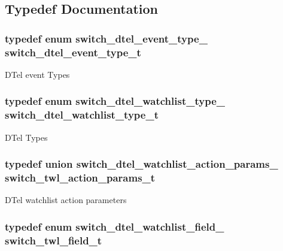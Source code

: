 \subsection{Typedef Documentation}
\hypertarget{group__DTel_ga093c7c7db287f39a58d5b3ec66bf15ec}{
\subsubsection[{switch\+\_\+dtel\+\_\+event\+\_\+type\+\_\+t}]{\setlength{\rightskip}{0pt plus 5cm}typedef enum {\bf switch\+\_\+dtel\+\_\+event\+\_\+type\+\_\+}  {\bf switch\+\_\+dtel\+\_\+event\+\_\+type\+\_\+t}}}\label{group__DTel_ga093c7c7db287f39a58d5b3ec66bf15ec}
D\+Tel event Types \hypertarget{group__DTel_ga4ab4177e5628351a6074dfbaee9c5857}{
\subsubsection[{switch\+\_\+dtel\+\_\+watchlist\+\_\+type\+\_\+t}]{\setlength{\rightskip}{0pt plus 5cm}typedef enum {\bf switch\+\_\+dtel\+\_\+watchlist\+\_\+type\+\_\+}  {\bf switch\+\_\+dtel\+\_\+watchlist\+\_\+type\+\_\+t}}}\label{group__DTel_ga4ab4177e5628351a6074dfbaee9c5857}
D\+Tel Types \hypertarget{group__DTel_ga8cce873b25ed2712f3fca9f1c43ca52a}{
\subsubsection[{switch\+\_\+twl\+\_\+action\+\_\+params\+\_\+t}]{\setlength{\rightskip}{0pt plus 5cm}typedef union {\bf switch\+\_\+dtel\+\_\+watchlist\+\_\+action\+\_\+params\+\_\+}  {\bf switch\+\_\+twl\+\_\+action\+\_\+params\+\_\+t}}}\label{group__DTel_ga8cce873b25ed2712f3fca9f1c43ca52a}
D\+Tel watchlist action parameters \hypertarget{group__DTel_gabf1727b3b95e347527f21edc4d190da3}{
\subsubsection[{switch\+\_\+twl\+\_\+field\+\_\+t}]{\setlength{\rightskip}{0pt plus 5cm}typedef enum {\bf switch\+\_\+dtel\+\_\+watchlist\+\_\+field\+\_\+}  {\bf switch\+\_\+twl\+\_\+field\+\_\+t}}}\label{group__DTel_gabf1727b3b95e347527f21edc4d190da3}
